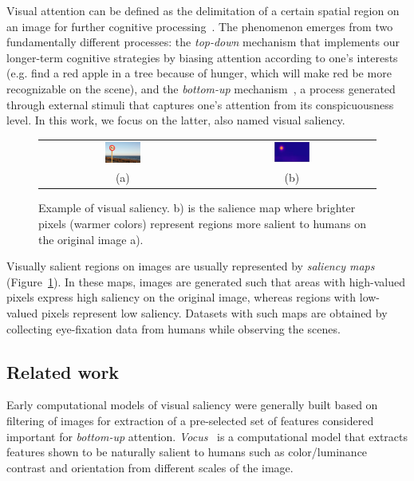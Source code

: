 \documentclass[10pt,twocolumn,letterpaper]{article}
\begin{document}
Visual attention can be defined as the delimitation of a certain spatial
region on an image for further cognitive processing~\cite{treisman_1980}.
The phenomenon emerges from two fundamentally different processes:
the \emph{top-down} mechanism that implements our longer-term cognitive
strategies by biasing attention according to one's interests
(e.g. find a red apple in a tree because of hunger,
which will make red be more recognizable on the scene),
and the \emph{bottom-up} mechanism~\cite{colombini_2016},
a process generated through external stimuli
that captures one's attention from its conspicuousness level.
In this work, we focus on the latter, also named visual saliency.

\begin{center}
\begin{figure}[t]
\begin{tabular} {cc}
\includegraphics[width=0.22\textwidth]{./img/traffic_sign_s.jpg} &
\includegraphics[width=0.22\textwidth]{./img/traffic_sign_m.jpg}\\
(a) & (b)
\end{tabular}
\caption{Example of visual saliency.
    b) is the salience map where brighter pixels (warmer colors)
    represent regions more salient to humans on the original image a).}
\label{fig:example}
\end{figure}
\end{center}

Visually salient regions on images are usually represented by
\emph{saliency maps} (Figure~\ref{fig:example}). In these maps, images are generated such that
areas with high-valued pixels express high saliency on the original image,
whereas regions with low-valued pixels represent low saliency.
Datasets with such maps are obtained by collecting eye-fixation
data from humans while observing the scenes.

\subsection{Related work}
Early computational models of visual saliency were generally built based on
filtering of images for extraction of a pre-selected set of features
considered important for \emph{bottom-up} attention.
\emph{Vocus}~\cite{frintrop_2005} is a computational model that extracts
features shown to be naturally salient to humans such as color/luminance
contrast and orientation from different scales of the image.
\end{document}
